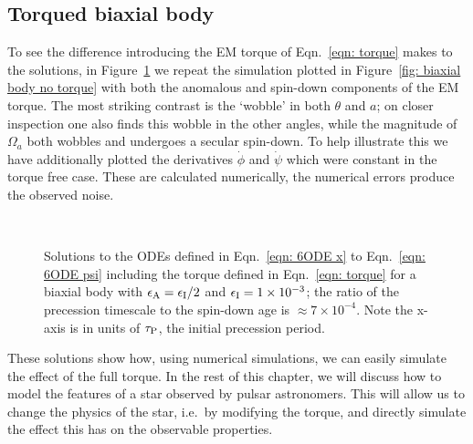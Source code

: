 \documentclass[../full_thesis/full_thesis.tex]{subfiles}
\begin{document}
\subsection{Torqued biaxial body}
\label{sec: biaxial body with torque}
To see the difference introducing the EM torque of Eqn.~\eqref{eqn: torque}  makes to the
solutions, in Figure~\ref{fig: biaxial body with torque} we repeat the simulation
plotted in Figure~\ref{fig: biaxial body no torque} with both the anomalous
and spin-down components of the EM torque. The most
striking contrast is the `wobble' in both $\theta$ and $a$; on closer
inspection one also finds this wobble in the other angles, while the magnitude of
$\Omega_a$ both wobbles and undergoes a secular spin-down. To help illustrate
this we have additionally plotted the derivatives $\dot{\phi}$ and $\dot{\psi}$
which were constant in the torque free case. These are calculated numerically,
the numerical errors produce the observed noise.
\afterpage{\clearpage}
\begin{figure}[p]
    \centering
{} \\
\caption{Solutions to the ODEs defined in Eqn.~\eqref{eqn: 6ODE x} to
Eqn.~\eqref{eqn: 6ODE psi} including the
torque defined in Eqn.~\eqref{eqn: torque} for a biaxial body with
$\epsilon_{\mathrm{A}}=\epsilon_{\mathrm{I}}/2$ and $\epsilon_{\mathrm{I}}=1\times10^{-3}$; the ratio of the precession timescale
to the spin-down age is $\approx 7\times10^{-4}$. Note the x-axis is in units of
$\tau_{\mathrm{P}}$, the initial precession period.}
\label{fig: biaxial body with torque}
\end{figure}

These solutions show how, using numerical simulations,
we can easily simulate the effect of the full \citet{Deutsch1955} torque. In the rest
of this chapter, we will discuss how to model the features of a star observed
by pulsar astronomers. This will allow us to change the physics of the star,
i.e.\ by modifying the torque, and directly simulate the effect this has on
the observable properties.
\end{document}
